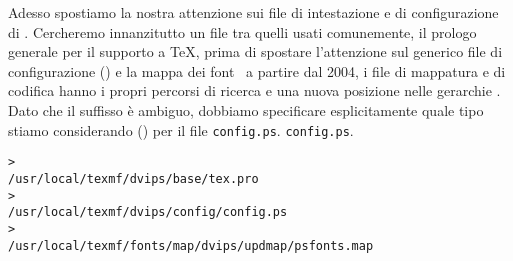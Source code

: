 \documentclass{article}
\begin{document}
Adesso spostiamo la nostra attenzione sui file di intestazione e di
configurazione di . Cercheremo innanzitutto un file tra
quelli usati comunemente, il prologo generale  per il
supporto a \TeX, prima di spostare l'attenzione sul generico file di
configurazione () e la mappa dei font \PS{}
 \Dash\ a partire dal 2004, i file di mappatura e di
codifica hanno i propri percorsi di ricerca e una nuova posizione nelle
gerarchie . Dato che il suffisso  è ambiguo,
dobbiamo specificare esplicitamente quale tipo stiamo considerando
() per il file \texttt{config.ps}.
\texttt{config.ps}.
\begin{alltt}
> 
   /usr/local/texmf/dvips/base/tex.pro
> 
   /usr/local/texmf/dvips/config/config.ps
> 
   /usr/local/texmf/fonts/map/dvips/updmap/psfonts.map
\end{alltt}
\end{document}

